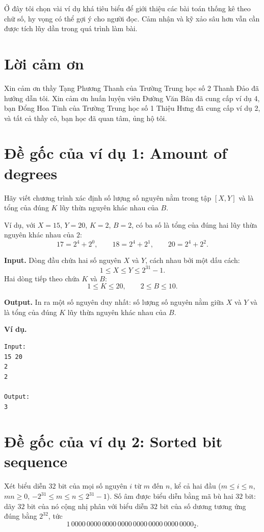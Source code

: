 \documentclass[11pt]{article}
\begin{document}
Ở đây tôi chọn vài ví dụ khá tiêu biểu để giới thiệu các bài toán thống kê
theo chữ số, hy vọng có thể gợi ý cho người đọc. Cảm nhận và kỹ xảo sâu hơn
vẫn cần được tích lũy dần trong quá trình làm bài.

\section*{Lời cảm ơn}

Xin cảm ơn thầy Tạng Phương Thanh của Trường Trung học số 2 Thanh Đảo đã hướng
dẫn tôi. Xin cảm ơn huấn luyện viên Đường Văn Bân đã cung cấp ví dụ 4, bạn
Đổng Hoa Tinh của Trường Trung học số 1 Thiệu Hưng đã cung cấp ví dụ 2, và
tất cả thầy cô, bạn học đã quan tâm, ủng hộ tôi.

\appendix
\section{Đề gốc của ví dụ 1: Amount of degrees}

Hãy viết chương trình xác định số lượng số nguyên nằm trong tập $[X,Y]$ và là
tổng của đúng $K$ lũy thừa nguyên khác nhau của $B$.

Ví dụ, với $X=15$, $Y=20$, $K=2$, $B=2$, có ba số là tổng của đúng hai lũy
thừa nguyên khác nhau của $2$:
\[
  17=2^4+2^0,\qquad
  18=2^4+2^1,\qquad
  20=2^4+2^2.
\]

\textbf{Input.} Dòng đầu chứa hai số nguyên $X$ và $Y$, cách nhau bởi một dấu
cách:
\[
  1\le X\le Y\le 2^{31}-1.
\]
Hai dòng tiếp theo chứa $K$ và $B$:
\[
  1\le K\le 20,\qquad 2\le B\le 10.
\]

\textbf{Output.} In ra một số nguyên duy nhất: số lượng số nguyên nằm giữa
$X$ và $Y$ và là tổng của đúng $K$ lũy thừa nguyên khác nhau của $B$.

\textbf{Ví dụ.}
\begin{verbatim}
Input:
15 20
2
2

Output:
3
\end{verbatim}

\section{Đề gốc của ví dụ 2: Sorted bit sequence}

Xét biểu diễn $32$ bit của mọi số nguyên $i$ từ $m$ đến $n$, kể cả hai đầu
($m\le i\le n$, $mn\ge 0$,
$-2^{31}\le m\le n\le 2^{31}-1$). Số âm được biểu diễn bằng mã bù hai $32$
bit: dãy $32$ bit của nó cộng nhị phân với biểu diễn $32$ bit của số dương
tương ứng đúng bằng $2^{32}$, tức
\[
  1\,0000\,0000\,0000\,0000\,0000\,0000\,0000\,0000_2.
\]
\end{document}
